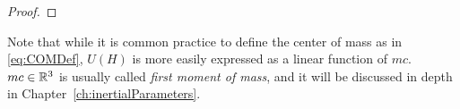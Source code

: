 \begin{proof}

\end{proof}

\begin{remark}
Note that while it is common practice to define the center of mass as in \eqref{eq:COMDef}, $U(H)$ is more easily expressed as a linear function of $m c$. $m c \in \mathbb{R}^3$ is usually called \emph{first moment of mass}, and it will be discussed in depth in Chapter~\ref{ch:inertialParameters}.
\end{remark}

